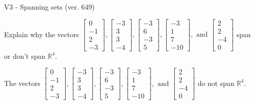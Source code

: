 \begin{exercise}
  \begin{exerciseTitle}V3 - Spanning sets (ver. 649)\end{exerciseTitle}
  \begin{exerciseStatement}
    Explain why the vectors \(\left[\begin{array}{r}
0 \\
-1 \\
2 \\
-3
\end{array}\right] , \left[\begin{array}{r}
-3 \\
3 \\
3 \\
-4
\end{array}\right] , \left[\begin{array}{r}
-3 \\
6 \\
-3 \\
5
\end{array}\right] , \left[\begin{array}{r}
-3 \\
1 \\
7 \\
-10
\end{array}\right] , \text{ and } \left[\begin{array}{r}
2 \\
2 \\
-4 \\
0
\end{array}\right]\) span or don't span \(\mathbb{R}^4\). 
	


  \end{exerciseStatement}
  \begin{exerciseAnswer}
   The vectors \(\left[\begin{array}{r}
0 \\
-1 \\
2 \\
-3
\end{array}\right] , \left[\begin{array}{r}
-3 \\
3 \\
3 \\
-4
\end{array}\right] , \left[\begin{array}{r}
-3 \\
6 \\
-3 \\
5
\end{array}\right] , \left[\begin{array}{r}
-3 \\
1 \\
7 \\
-10
\end{array}\right] , \text{ and } \left[\begin{array}{r}
2 \\
2 \\
-4 \\
0
\end{array}\right]\) 
  	 do not  
	span \(\mathbb{R}^4\).
  



\end{exerciseAnswer}
\end{exercise}

